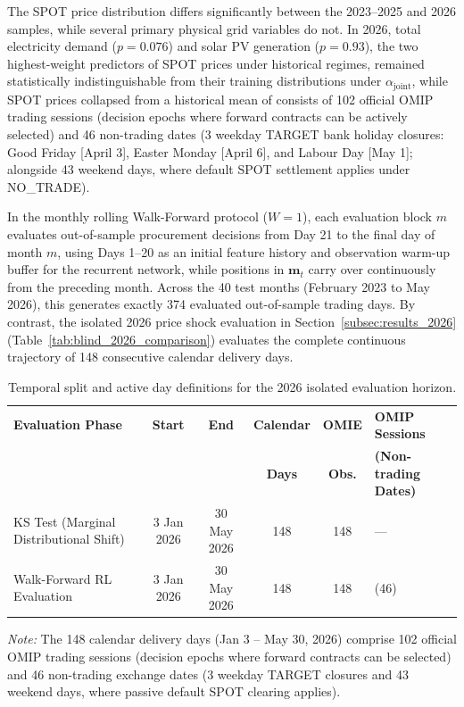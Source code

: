 The SPOT price distribution differs significantly between the 2023--2025 and 2026 samples, while several primary physical grid variables do not.
In 2026, total electricity demand ($p = 0.076$) and solar PV generation
($p = 0.93$), the two highest-weight predictors of SPOT prices under
historical regimes, remained statistically indistinguishable from their
training distributions under $\alpha_{\text{joint}}$, while SPOT prices collapsed from a historical mean of
consists of 102 official OMIP trading sessions (decision epochs where forward contracts can be actively selected) and 46 non-trading dates (3 weekday TARGET bank holiday closures: Good Friday [April 3], Easter Monday [April 6], and Labour Day [May 1]; alongside 43 weekend days, where default SPOT settlement applies under NO\_TRADE).

In the monthly rolling Walk-Forward protocol ($W=1$), each evaluation block $m$ evaluates out-of-sample procurement decisions from Day 21 to the final day of month $m$, using Days 1--20 as an initial feature history and observation warm-up buffer for the recurrent network, while positions in $\mathbf{m}_t$ carry over continuously from the preceding month. Across the 40 test months (February 2023 to May 2026), this generates exactly 374 evaluated out-of-sample trading days. By contrast, the isolated 2026 price shock evaluation in Section~\ref{subsec:results_2026} (Table~\ref{tab:blind_2026_comparison}) evaluates the complete continuous trajectory of 148 consecutive calendar delivery days.

\begin{table}[htbp]
\centering
\footnotesize
\setlength{\tabcolsep}{3pt}
\caption{Temporal split and active day definitions for the 2026 isolated evaluation horizon.}
\label{tab:evaluation_days}
\begin{tabularx}{\linewidth}{@{} >{\raggedright\arraybackslash}X cc c c >{\centering\arraybackslash}p{2.5cm}@{}}
\toprule
\textbf{Evaluation Phase} & \textbf{Start} & \textbf{End} & \textbf{Calendar} & \textbf{OMIE} & \textbf{OMIP Sessions} \\
 & & & \textbf{Days} & \textbf{Obs.} & \textbf{(Non-trading Dates)} \\
\midrule
KS Test (Marginal Distributional Shift) & 3 Jan 2026 & 30 May 2026 & 148 & 148 & --- \\
Walk-Forward RL Evaluation & 3 Jan 2026 & 30 May 2026 & 148 & 148 & 102 (46) \\
\bottomrule
\end{tabularx}
\par\smallskip\raggedright\scriptsize \textit{Note:} The 148 calendar delivery days (Jan 3 -- May 30, 2026) comprise 102 official OMIP trading sessions (decision epochs where forward contracts can be selected) and 46 non-trading exchange dates (3 weekday TARGET closures and 43 weekend days, where passive default SPOT clearing applies).
\end{table}

